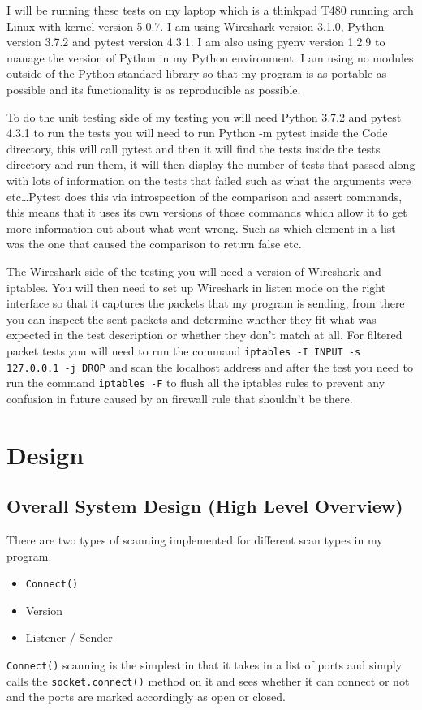 \documentclass[titlepage]{article}
\let\Oldsection\section{}
\renewcommand{\section}{\FloatBarrier\Oldsection}
\let\Oldsubsection\subsection{}
\renewcommand{\subsection}{\FloatBarrier\Oldsubsection}
\begin{document}
I will be running these tests on my laptop which is a thinkpad T480 running arch Linux
with kernel version 5.0.7. I am using Wireshark version 3.1.0, Python version 3.7.2 and
pytest version 4.3.1. I am also using pyenv version 1.2.9 to manage the version of Python in
my Python environment. I am using no modules outside of the Python standard library so that
my program is as portable as possible and its functionality is as reproducible as possible.

To do the unit testing side of my testing you will need Python 3.7.2 and pytest 4.3.1
to run the tests you will need to run Python -m pytest inside the Code directory, this will
call pytest and then it will find the tests inside the tests directory and run them, it
will then display the number of tests that passed along with lots of information on the
tests that failed such as what the arguments were etc\ldots Pytest does this via introspection
of the comparison and assert commands, this means that it uses its own versions of those commands
which allow it to get more information out about what went wrong. Such as which element in a list
was the one that caused the comparison to return false etc.

The Wireshark side of the testing you will need a version of Wireshark and iptables.
You will then need to set up Wireshark in listen mode on the right interface so that it
captures the packets that my program is sending, from there you can inspect the sent packets and
determine whether they fit what was expected in the test description or whether they don't match at
all. For filtered packet tests you will need to run the command \verb|iptables -I INPUT -s 127.0.0.1 -j DROP|
and scan the localhost address and after the test you need to run the command \verb|iptables -F| 
to flush all the iptables rules to prevent any confusion in future caused by an firewall rule
that shouldn't be there.

\section{Design}

\subsection{Overall System Design (High Level Overview)}

There are two types of scanning implemented for different scan types in my program.
\begin{itemize}
  \item{\verb|Connect()|}
  \item{Version}
  \item{Listener / Sender}
\end{itemize}
\verb|Connect()| scanning is the simplest in that it takes in a list of \glspl{port} and simply 
calls the \verb|socket.connect()| method on it and sees whether it can connect or not and the 
\glspl{port} are marked accordingly as open or closed. 
\end{document}
